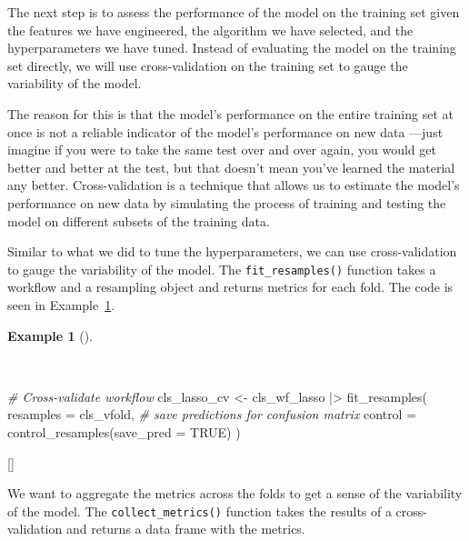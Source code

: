 \documentclass[
  letterpaper,
  krantz1]{latex/krantz-mod}
\newenvironment{Shaded}{\begin{snugshade}}{\end{snugshade}}
\newcommand{\AttributeTok}[1]{\textcolor[rgb]{0.00,0.00,0.00}{#1}}
\newcommand{\CommentTok}[1]{\textcolor[rgb]{0.00,0.00,0.00}{\textit{#1}}}
\newcommand{\ConstantTok}[1]{\textcolor[rgb]{0.00,0.00,0.00}{#1}}
\newcommand{\FunctionTok}[1]{\textcolor[rgb]{0.00,0.00,0.00}{#1}}
\newcommand{\NormalTok}[1]{\textcolor[rgb]{0.00,0.00,0.00}{#1}}
\newcommand{\OtherTok}[1]{\textcolor[rgb]{0.00,0.00,0.00}{#1}}
\newcommand{\SpecialCharTok}[1]{\textcolor[rgb]{0.00,0.00,0.00}{#1}}
\newcommand{\cindex}[1]{%
  \StrSubstitute{#1}{_}{\_}[\temp]%
  \index{\temp}%
}
\theoremstyle{definition}
\theoremstyle{definition}
\newtheorem{example}{Example}[chapter]
\theoremstyle{remark}
\begin{document}
The next step is to assess the performance of the model on the training
set given the features we have engineered, the algorithm we have
selected, and the hyperparameters we have tuned. Instead of evaluating
the model on the training set directly, we will use
cross-validation on the training set to
gauge the variability of the model.

The reason for this is that the model's performance on the entire
training set at once is not a reliable indicator of the model's
performance on new data ---just imagine if you were to take the same
test over and over again, you would get better and better at the test,
but that doesn't mean you've learned the material any better.
Cross-validation is a technique that allows us to estimate the model's
performance on new data by simulating the process of training and
testing the model on different subsets of the training data.

Similar to what we did to tune the hyperparameters, we can use
cross-validation to gauge the variability of the model. The
\texttt{fit\_resamples()} function takes a workflow and a resampling
object and returns metrics for each fold. The code is seen in
Example~\ref{exm-predict-class-tune-hyperparameters-evaluate-workflow-cv}.

\begin{example}[]\protect\hypertarget{exm-predict-class-tune-hyperparameters-evaluate-workflow-cv}{}\label{exm-predict-class-tune-hyperparameters-evaluate-workflow-cv}

~

\begin{Shaded}
\begin{Highlighting}[numbers=left,,]
\CommentTok{\# Cross{-}validate workflow}
\NormalTok{cls\_lasso\_cv }\OtherTok{\textless{}{-}}
\NormalTok{  cls\_wf\_lasso }\SpecialCharTok{|\textgreater{}}
  \FunctionTok{fit\_resamples}\NormalTok{(}
    \AttributeTok{resamples =}\NormalTok{ cls\_vfold,}
    \CommentTok{\# save predictions for confusion matrix}
    \AttributeTok{control =} \FunctionTok{control\_resamples}\NormalTok{(}\AttributeTok{save\_pred =} \ConstantTok{TRUE}\NormalTok{)}
\NormalTok{  )}
\end{Highlighting}
\end{Shaded}

 \cindex{fit_resamples()}

\end{example}

We want to aggregate the metrics across the folds to get a sense of the
variability of the model. The \texttt{collect\_metrics()} function takes
the results of a cross-validation and returns a data frame with the
metrics.
\end{document}
